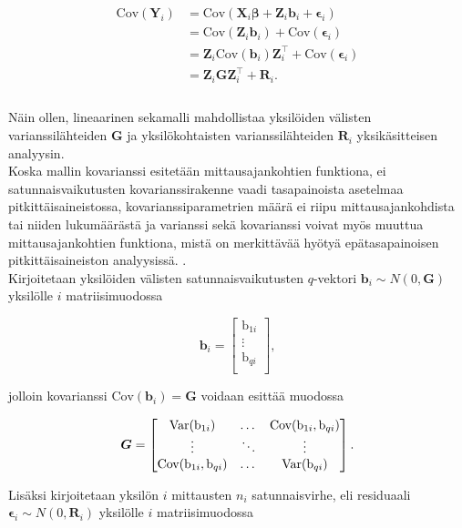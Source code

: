 \documentclass[finnish]{docopts}
\begin{document}
$$
\begin{aligned}
\text{Cov}(\bm{Y}_i) &= \text{Cov}(\bm{X}_i \bm{\beta} +\bm{Z}_i\bm{b}_i + \bm{\epsilon}_i) \\
&= \text{Cov}(\bm{Z}_i \bm{b}_i) + \text{Cov}(\bm{\epsilon}_i) \\
&= \bm{Z}_i \text{Cov} (\bm{b}_i) \bm{Z}^\top_i + \text{Cov}(\bm{\epsilon}_i)\\
&= \bm{Z}_i \bm{G} \bm{Z}^\top_i + \bm{R}_i.\\
\end{aligned}
$$ \\

Näin ollen, lineaarinen sekamalli mahdollistaa yksilöiden välisten varianssilähteiden $\bm{G}$ ja yksilökohtaisten varianssilähteiden $\bm{R}_i$ yksikäsitteisen analyysin. \\

Koska mallin kovarianssi esitetään mittausajankohtien funktiona, ei satunnaisvaikutusten kovarianssirakenne vaadi tasapainoista asetelmaa pitkittäisaineistossa, kovarianssiparametrien määrä ei riipu mittausajankohdista tai niiden lukumäärästä ja varianssi sekä kovarianssi voivat myös muuttua mittausajankohtien funktiona, mistä on merkittävää hyötyä epätasapainoisen pitkittäisaineiston analyysissä. \citep{fitzmaurice11}. \\

Kirjoitetaan yksilöiden välisten satunnaisvaikutusten $q$-vektori $\bm{b}_i \sim N(0,\bm{G})$ yksilölle $i$ matriisimuodossa

$$
\bm{b}_i =
\begin{bmatrix}
\text{b}_{1i} \\
\vdots \\
\text{b}_{qi} \\
\end{bmatrix},
$$

jolloin kovarianssi  $\text{Cov}(\bm{b}_i) = \bm{G}$ voidaan esittää muodossa

$$
\bm{G} =
\begin{bmatrix}
\text{Var}(\text{b}_{1i}) & \dots & \text{Cov}(\text{b}_{1i}, \text{b}_{qi}) \\
\vdots & \ddots & \vdots \\
\text{Cov}(\text{b}_{1i}, \text{b}_{qi}) & \dots & \text{Var}(\text{b}_{qi}) \\
\end{bmatrix}. \\
$$

Lisäksi kirjoitetaan yksilön $i$ mittausten $n_i$ satunnaisvirhe, eli residuaali $\bm{\epsilon}_i \sim N(0,\bm{R}_i)$ yksilölle $i$ matriisimuodossa
\end{document}
